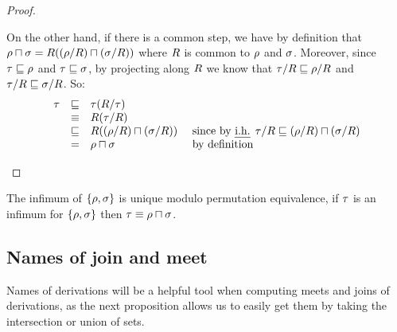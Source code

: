 \begin{proof}
\begin{enumerate}
  On the other hand, if there is a common step, we have by definition that
  $\rho \sqcap \sigma = R((\rho/R) \sqcap (\sigma/R))$
  where $R$ is common to $\rho$ and $\sigma$.
  Moreover, since $\tau \sqsubseteq \rho$ and $\tau \sqsubseteq \sigma$,
  by projecting along $R$ we know that
  $\tau/R \sqsubseteq \rho/R$ and $\tau/R \sqsubseteq \sigma/R$.
  So:
  \[
    \begin{array}{rcll}
      \redseqthree & \permle & \redseqthree(\redex/\redseqthree) \\
                   & \permeq & \redex(\redseqthree/\redex) \\
                   & \permle & \redex((\redseq/\redex) \sqcap (\redseqtwo/\redex)) & \text{ since by \ih $\redseqthree/\redex \permle (\redseq/\redex) \sqcap (\redseqtwo/\redex)$} \\
                   & =       & \redseq \sqcap \redseqtwo & \text{ by definition}
    \end{array}
  \]
\end{enumerate}
\end{proof}

\begin{remark}
The infimum of $\{\rho,\sigma\}$ is unique modulo permutation equivalence,
\ie if $\tau$ is an infimum for $\{\rho,\sigma\}$ then $\tau \equiv \rho \sqcap \sigma$.
\end{remark}

\subsection*{Names of join and meet}

Names of derivations will be a helpful tool when computing
meets and joins of derivations, as the next proposition
allows us to easily get them by
taking the intersection or union of sets.

